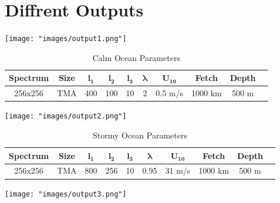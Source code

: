 \section{Diffrent Outputs}

\begin{minipage}{1\textwidth}
    \centering
    \texttt{[image: "images/output1.png"]}
    \label{fig:output_1}
\end{minipage}

\begin{table}[h]
    \centering
    \begin{tabular}{|c|c|c|c|c|c|c|c|c|c|}
        \hline
        \textbf{Spectrum} & \textbf{Size} & $\mathbf{l_1}$ & $\mathbf{l_2}$ & $\mathbf{l_3}$ & $\mathbf{\lambda}$ & $\mathbf{U_{10}}$ & \textbf{Fetch} & \textbf{Depth} \\
        \hline
        256x256 & TMA & 400 & 100 & 10 & 2 & 0.5 m/s & 1000 km & 500 m \\
        \hline
    \end{tabular}
    \caption{Calm Ocean Parameters}
    \label{tab:output_1}
\end{table}

\begin{minipage}{1\textwidth}
    \centering
    \texttt{[image: "images/output2.png"]}
    \label{fig:output_2}
\end{minipage}

\begin{table}[h]
    \centering
    \begin{tabular}{|c|c|c|c|c|c|c|c|c|c|}
        \hline
        \textbf{Spectrum} & \textbf{Size} & $\mathbf{l_1}$ & $\mathbf{l_2}$ & $\mathbf{l_3}$ & $\mathbf{\lambda}$ & $\mathbf{U_{10}}$ & \textbf{Fetch} & \textbf{Depth} \\
        \hline
        256x256 & TMA & 800 & 256 & 10 & 0.95 & 31 m/s & 1000 km & 500 m \\
        \hline
    \end{tabular}
    \caption{Stormy Ocean Parameters}
    \label{tab:output_2}
\end{table}

\begin{minipage}{1\textwidth}
    \centering
    \texttt{[image: "images/output3.png"]}
    \label{fig:output_3}
\end{minipage}

